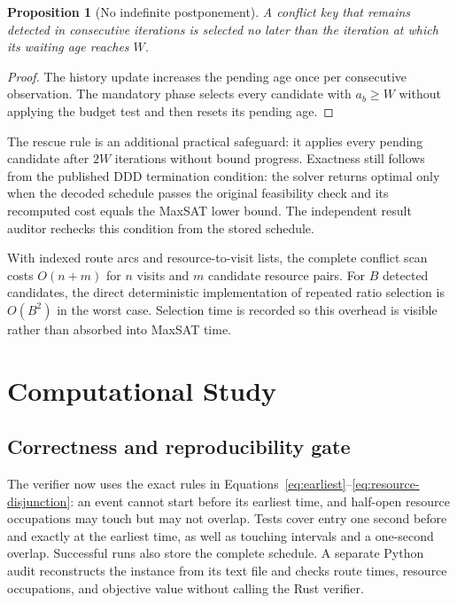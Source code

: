 \documentclass[preprint,12pt,authoryear]{elsarticle}
\newtheorem{proposition}{Proposition}
\begin{document}
\begin{proposition}[No indefinite postponement]
A conflict key that remains detected in consecutive iterations is selected no
later than the iteration at which its waiting age reaches $W$.
\end{proposition}
\begin{proof}
The history update increases the pending age once per consecutive observation.
The mandatory phase selects every candidate with $a_b\ge W$ without applying
the budget test and then resets its pending age.
\end{proof}

The rescue rule is an additional practical safeguard: it applies every pending
candidate after $2W$ iterations without bound progress. Exactness still follows
from the published DDD termination condition: the solver returns optimal only
when the decoded schedule passes the original feasibility check and its
recomputed cost equals the MaxSAT lower bound. The independent result auditor
rechecks this condition from the stored schedule.

With indexed route arcs and resource-to-visit lists, the complete conflict scan
costs $O(n+m)$ for $n$ visits and $m$ candidate resource pairs. For $B$ detected
candidates, the direct deterministic implementation of repeated ratio selection
is $O(B^2)$ in the worst case. Selection time is recorded so this overhead is
visible rather than absorbed into MaxSAT time.

\section{Computational Study}
\label{sec:experiments}

\subsection{Correctness and reproducibility gate}
\label{sec:correctness-gate}

The verifier now uses the exact rules in
Equations~\eqref{eq:earliest}--\eqref{eq:resource-disjunction}: an event cannot
start before its earliest time, and half-open resource occupations may touch
but may not overlap. Tests cover entry one second before and exactly at the
earliest time, as well as touching intervals and a one-second overlap. Successful
runs also store the complete schedule. A separate Python audit reconstructs the
instance from its text file and checks route times, resource occupations, and
objective value without calling the Rust verifier.
\end{document}
